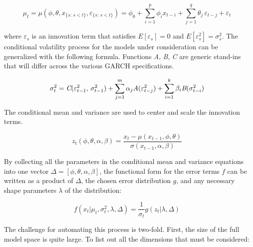 \documentclass[12pt]{article}
\begin{document}
\begin{equation}
    \mu_{t} = \mu(\phi, \theta, x_{\{s:\, s < t\}}, \varepsilon_{\{s:\, s < t\}}) = \phi_{0} + \sum_{i=1}^{p} \phi_{i} x_{t-i} + \sum_{j=1}^{q} \theta_{j} \, \varepsilon_{t - j} + \varepsilon_{t}
\end{equation}

where $\varepsilon_{s}$ is an innovation term that satisfies $E[\varepsilon_{s}] = 0$ and $E[\varepsilon^{2}_{s}] = \sigma^{2}_{s}$. The conditional volatility process for the models under consideration can be generalized with the following formula. Functions \emph{A}, \emph{B}, \emph{C} are generic stand-ins that will differ across the various GARCH specifications.

\begin{equation}
    \sigma^{2}_{t} = \emph{C}(\varepsilon^{2}_{t-1}, \, \sigma^{2}_{t-1}) + \sum_{j=1}^{m} \alpha_{j} \emph{A}(\varepsilon^{2}_{t - j}) + \sum_{i=1}^{k} \beta_{i} \emph{B}(\sigma^{2}_{t - i})
\end{equation}

The conditional mean and variance are used to center and scale the innovation terms.

\begin{equation}
    z_{t}(\phi, \theta, \alpha, \beta) = \frac{x_{t} - \mu(x_{t-1}, \phi, \theta)}{\sigma(x_{t-1}, \alpha, \beta)}
\end{equation}

By collecting all the parameters in the conditional mean and variance equations into one vector $\Delta = [\phi, \theta, \alpha, \beta]$, the functional form for the error terms $f$ can be written as a product of $\Delta$, the chosen error distribution $g$, and any necessary shape parameters $\lambda$ of the distribution:

\begin{equation}
    f(x_{t} | \mu_{t}, \sigma^{2}_{t}, \lambda, \Delta) = \frac{1}{\sigma_{t}} g(z_{t} | \lambda, \Delta)
\end{equation}

The challenge for automating this process is two-fold. First, the size of the full model space is quite large. To list out all the dimensions that must be considered:
\end{document}
